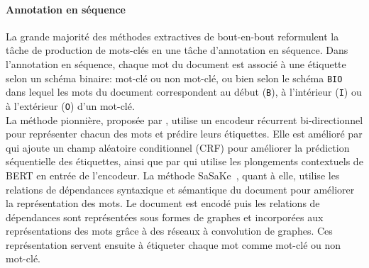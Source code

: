 \paragraph{Annotation en séquence}
La grande majorité des méthodes extractives de bout-en-bout reformulent la tâche de production de mots-clés en une tâche d'annotation en séquence.
Dans l'annotation en séquence, chaque mot du document est associé à une étiquette selon un schéma binaire: mot-clé ou non mot-clé, ou bien selon le schéma \texttt{BIO} dans lequel les mots du document correspondent au début (\texttt{B}), à l'intérieur (\texttt{I}) ou à l'extérieur (\texttt{O}) d'un mot-clé.\\
%
La méthode pionnière, proposée par \citet{augenstein_multi-task_2017}, utilise un encodeur récurrent bi-directionnel pour représenter chacun des mots et prédire leurs étiquettes.
Elle est amélioré par \citet{alzaidy_bi-lstm-crf_2019} qui ajoute un champ aléatoire conditionnel (CRF) pour améliorer la prédiction séquentielle des étiquettes, ainsi que par \citet{sahrawat_keyphrase_2019} qui utilise les plongements contextuels de BERT en entrée de l'encodeur.
%
La méthode SaSaKe~\cite{santosh_sasake_2020}, quant à elle, utilise les relations de dépendances syntaxique et sémantique du document pour améliorer la représentation des mots.
Le document est encodé puis les relations de dépendances sont représentées sous formes de graphes et incorporées aux représentations des mots grâce à des réseaux à convolution de graphes.
Ces représentation servent ensuite à étiqueter chaque mot comme mot-clé ou non mot-clé.
%
%

